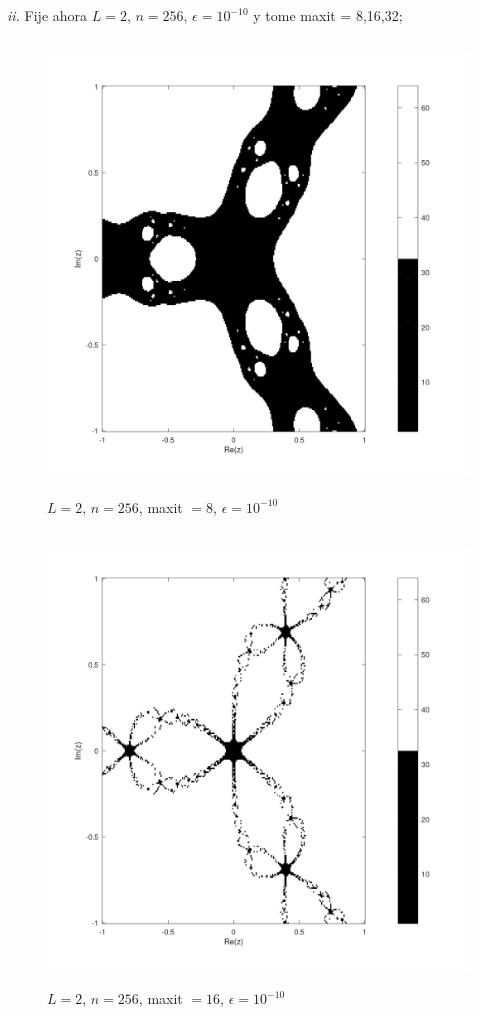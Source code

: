 \documentclass{article} %
\begin{document}
\newpage

\textit{ii.} Fije ahora $L=2$, $n=256$, $\epsilon=10^{-10}$ y tome maxit = 8,16,32;

\begin{figure}[H]
    \centering
    \includegraphics[width=152mm, height=120mm]{images/L2n256maxit8e10-10.png}
    \caption{$L=2$, $n=256$, maxit $=8$, $\epsilon=10^{-10}$}
\end{figure}

\begin{figure}[H]
    \centering
    \includegraphics[width=152mm, height=120mm]{images/L2n256maxit16e10-10.png}
    \caption{$L=2$, $n=256$, maxit $=16$, $\epsilon=10^{-10}$}
\end{figure}
\end{document}
